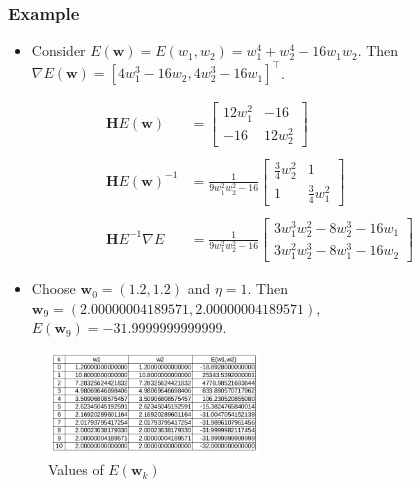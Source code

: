 \documentclass[
]{article}
\providecommand{\tightlist}{%
  \setlength{\itemsep}{0pt}\setlength{\parskip}{0pt}}
\begin{document}
\hypertarget{example-1}{%
\subsubsection{Example}\label{example-1}}

\begin{itemize}
\tightlist
\item
  Consider \(E({\boldsymbol{w}})=E(w_1,w_2)= w_1^4+w_2^4-16w_1w_2\).
  Then
  \(\nabla E({\boldsymbol{w}})= [ 4w_1^3-16w_2, 4w_2^3-16w_1]^\top\).
\end{itemize}

\begin{align*} \mathbf H E({\boldsymbol{w}}) &= \begin{bmatrix} 12 w_1^2 & -16 \\ -16 & 12 w_2^2 \end{bmatrix} \\ \\ \mathbf H E({\boldsymbol{w}})^{-1} &= \frac 1 {9w_1^2 w_2^2 -16} \begin{bmatrix} \tfrac 3 4 w_2^2 & 1 \\ 1& \frac 3 4 w_1^2  \end{bmatrix} \\  \\
\mathbf H E^{-1} \nabla E & = \frac 1 {9w_1^2 w_2^2 -16} \begin{bmatrix} 3 w_1^3 w_2^2 -8 w_2^3 -16w_1 \\ 3 w_1^2 w_2^3 -8 w_1^3  -16w_2  \end{bmatrix} \end{align*}

\begin{itemize}
\tightlist
\item
  Choose \({\boldsymbol{w}}_0=(1.2,1.2)\) and \(\eta =1\). Then
  \({\boldsymbol{w}}_{9}=(2.00000004189571, 2.00000004189571)\),
  \(E({\boldsymbol{w}}_{9})= -31.9999999999999\).
\end{itemize}

\begin{figure}
\hypertarget{fig:tab}{%
\centering
\includegraphics[width=0.5\textwidth,height=\textheight]{table-1.png}
\caption{Values of \(E({\boldsymbol{w}}_k)\)}\label{fig:tab}
}
\end{figure}
\end{document}
